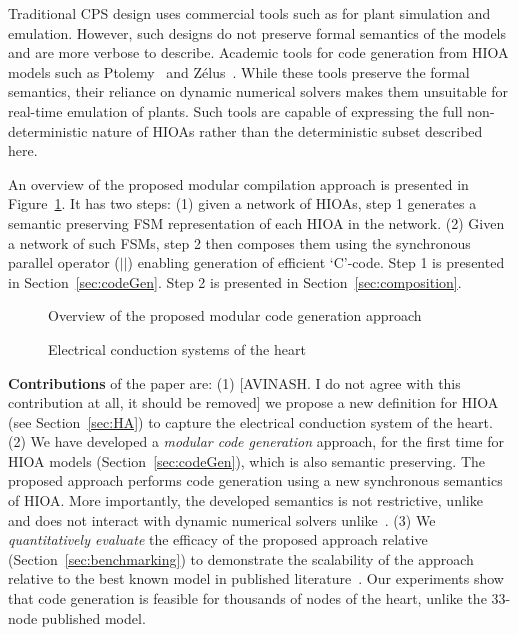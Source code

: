{  Traditional \ac{CPS} design uses commercial tools such as \simulink
  for plant simulation and emulation. However, such designs do not
  preserve formal semantics of the models and are more verbose to
  describe. Academic tools for code generation from \ac{HIOA} models
  such as Ptolemy~\cite{ptolemaeus2014system} and
  Z\'{e}lus~\cite{bourke13zelus}. While these tools preserve the formal
  semantics, their reliance on dynamic numerical solvers makes them
  unsuitable for real-time emulation of plants. Such tools are capable
  of expressing the full non-deterministic nature of \acp{HIOA} rather
  than the deterministic subset described here.}

An overview of the proposed modular compilation approach is presented in
Figure~\ref{fig:overview}. It has two steps: (1) given a network of
\acp{HIOA}, step 1 generates a semantic preserving \ac{FSM}
representation of each \ac{HIOA} in the network. (2) Given a network of
such \acp{FSM}, step 2 then composes them using the synchronous parallel
operator ($||$) enabling generation of efficient `C'-code. Step 1 is
presented in Section~\ref{sec:codeGen}. Step 2 is presented in
Section~\ref{sec:composition}.


\begin{figure}[bthp]
  \centering \scalebox{0.7}{  }
  \caption{Overview of the proposed modular code generation
    approach \label{fig:overview}}
\end{figure}

\begin{figure*}[hbpt]
  \centering 
  \caption{Electrical conduction systems of the heart}
  \label{fig:heartOverview}
\end{figure*}

\textbf{Contributions} of the paper are: (1) {\color{red} [AVINASH. I do
  not agree with this contribution at all, it should be removed] we
  propose a new definition for \acf{HIOA} (see Section~\ref{sec:HA}) to
  capture the electrical conduction system of the heart.} (2) We have
developed a \emph{modular code generation} approach, for the first time
for \ac{HIOA} models (Section~\ref{sec:codeGen}), which is also semantic
preserving. The proposed approach performs code generation using a new
synchronous semantics~\cite{benveniste03} of \ac{HIOA}. More
importantly, the developed semantics is not restrictive,
unlike~\cite{alur2003generating, kim2003modular} and does not interact
with dynamic numerical solvers unlike~\cite{ptolemaeus2014system,
  bourke13zelus}. (3) We \emph{quantitatively evaluate} the efficacy of
the proposed approach relative \simulink
(Section~\ref{sec:benchmarking}) to demonstrate the scalability of the
approach relative to the best known model in published
literature~\cite{chen14}. Our experiments show that code generation is
feasible for thousands of nodes of the heart, unlike the 33-node
published model. %




